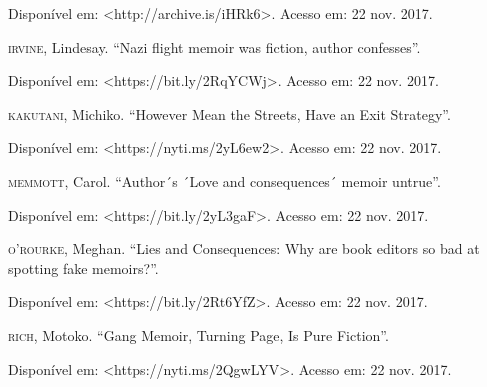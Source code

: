 \begin{Parskip}
Disponível em: \textless{}http://archive.is/iHRk6\textgreater{}. 
Acesso em: 22 nov. 2017.

\textsc{irvine}, Lindesay. ``Nazi flight memoir was fiction, author
confesses''. 

Disponível em: \textless{}https://bit.ly/2RqYCWj\textgreater{}.
Acesso em: 22 nov. 2017.

\textsc{kakutani}, Michiko. ``However Mean the Streets, Have an Exit
Strategy''. 

Disponível em: \textless{}https://nyti.ms/2yL6ew2\textgreater{}.
Acesso em: 22 nov. 2017.

\textsc{memmott}, Carol. ``Author´s ´Love and consequences´ memoir
untrue''. 

Disponível em: \textless{}https://bit.ly/2yL3gaF\textgreater{}.
Acesso em: 22 nov. 2017.

\textsc{o'rourke}, Meghan. ``Lies and Consequences: Why are book editors
so bad at spotting fake memoirs?''. 

Disponível em: \textless{}https://bit.ly/2Rt6YfZ\textgreater{}.
Acesso em: 22 nov. 2017.

\textsc{rich}, Motoko. ``Gang Memoir, Turning Page, Is Pure Fiction''.

Disponível em: \textless{}https://nyti.ms/2QgwLYV\textgreater{}.
Acesso em: 22 nov. 2017.

\end{Parskip}